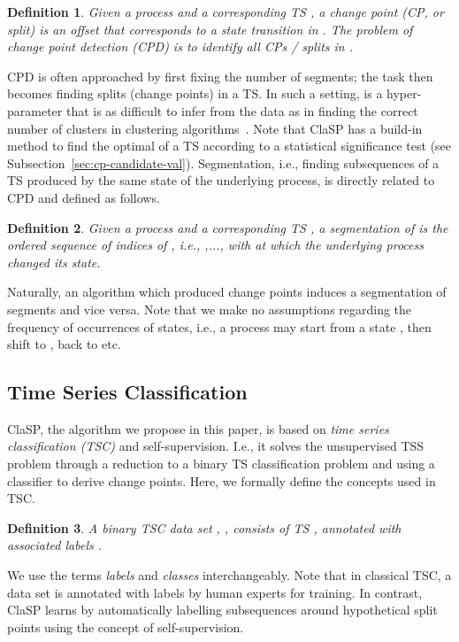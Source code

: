 \documentclass[pdflatex,sn-basic]{sn-jnl}
\newtheorem{definition}{Definition}
\begin{document}
\begin{definition}
Given a process  and a corresponding TS , a \emph{change point (CP, or split)} is an offset  that corresponds to a state transition in . The problem of change point detection (CPD) is to identify all CPs / splits in .
\end{definition}

CPD is often approached by first fixing the number  of segments; the task then becomes finding  splits (change points) in a TS. In such a setting,  is a hyper-parameter that is as difficult to infer from the data as in finding the correct number of clusters in clustering algorithms~\citep{Nguyen2015}. Note that ClaSP has a build-in method to find the optimal  of a TS according to a statistical significance test (see Subsection~\ref{sec:cp-candidate-val}). Segmentation, i.e., finding subsequences of a TS produced by the same state of the underlying process, is directly related to CPD and defined as follows.

\begin{definition}
Given a process  and a corresponding TS , a \emph{segmentation} of  is the ordered sequence of indices of , i.e., ,..., with  at which the underlying process  changed its state. 
\end{definition}

Naturally, an algorithm which produced  change points induces a segmentation of  segments and vice versa. Note that we make no assumptions regarding the frequency of occurrences of states, i.e., a process may start from a state , then shift to , back to  etc. 


\subsection{Time Series Classification}

ClaSP, the algorithm we propose in this paper, is based on  \emph{time series classification (TSC)} and self-supervision. I.e., it solves the unsupervised TSS problem through a reduction to a binary TS classification problem and using a classifier to derive change points. Here, we formally define the concepts used in TSC. 

\begin{definition}
A binary TSC data set , ,  consists of  TS ,  annotated with associated labels . 
\end{definition}

We use the terms \emph{labels} and \emph{classes} interchangeably. Note that in classical TSC, a data set is annotated with labels by human experts for training. In contrast, ClaSP learns by automatically labelling subsequences around hypothetical split points using the concept of self-supervision.
\end{document}
